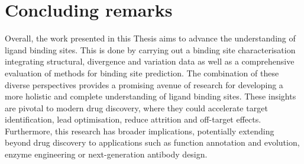 \section{Concluding remarks}

Overall, the work presented in this Thesis aims to advance the understanding of ligand binding sites. This is done by carrying out a binding site characterisation integrating structural, divergence and variation data as well as a comprehensive evaluation of methods for binding site prediction. The combination of these diverse perspectives provides a promising avenue of research for developing a more holistic and complete understanding of ligand binding sites. These insights are pivotal to modern drug discovery, where they could accelerate target identification, lead optimisation, reduce attrition and off-target effects. Furthermore, this research has broader implications, potentially extending beyond drug discovery to applications such as function annotation and evolution, enzyme engineering or next-generation antibody design.